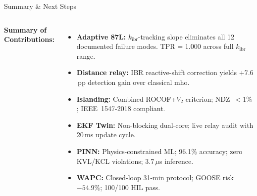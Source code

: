 \documentclass[aspectratio=169, 10pt]{beamer}
\newcommand{\kibr}{k_{\mathrm{ibr}}}
\begin{document}
\begin{frame}{Summary \& Next Steps}
  \begin{columns}[T]
      \vspace{0.2cm}
      {\small\bfseries\color{iitmMaroon} Summary of Contributions:}
      \begin{itemize}
        \setlength\itemsep{4pt}
        \scriptsize
        \item[\textbf{C1.}]\textbf{Adaptive 87L:} $\kibr$-tracking slope eliminates
              all 12 documented failure modes. TPR = 1.000 across full $\kibr$ range.
        \item[\textbf{C2.}]\textbf{Distance relay:} IBR reactive-shift correction
              yields $+7.6$\,pp detection gain over classical mho.
        \item[\textbf{C3.}]\textbf{Islanding:} Combined ROCOF+$V_2$ criterion;
              NDZ~$<1\%$; IEEE~1547-2018 compliant.
        \item[\textbf{C4.}]\textbf{EKF Twin:} Non-blocking dual-core; live relay
              audit with 20\,ms update cycle.
        \item[\textbf{C5.}]\textbf{PINN:} Physics-constrained ML; 96.1\% accuracy;
              zero KVL/KCL violations; 3.7\,$\mu$s inference.
        \item[\textbf{C6.}]\textbf{WAPC:} Closed-loop 31-min protocol; GOOSE risk
              $-54.9\%$; 100/100 HIL pass.
      \end{itemize}


\end{columns}
\end{frame}
\end{document}
